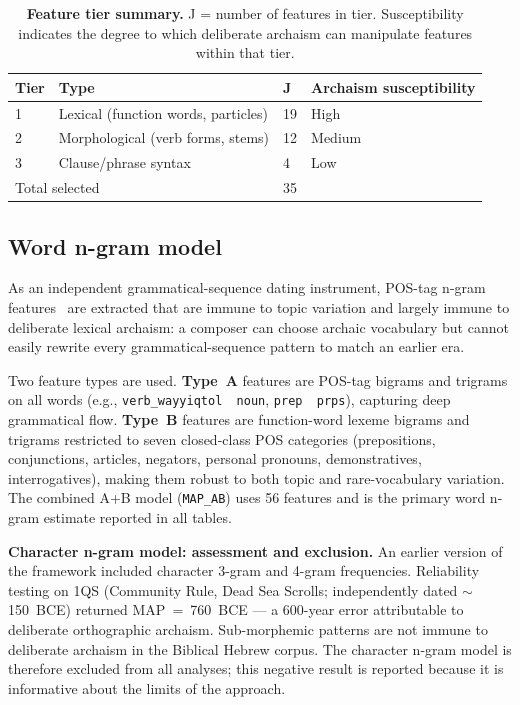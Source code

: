 \documentclass[10pt,letterpaper]{article}
\begin{document}
\begin{table}[!ht]
\centering
\caption{\textbf{Feature tier summary.}  J = number of features in tier.
Susceptibility indicates the degree to which deliberate archaism can
manipulate features within that tier.}
\begin{tabular}{llll}
\hline
\textbf{Tier} & \textbf{Type} & \textbf{J} & \textbf{Archaism susceptibility} \\
\hline
1 & Lexical (function words, particles) & 19 & High \\
2 & Morphological (verb forms, stems)   & 12 & Medium \\
3 & Clause/phrase syntax                &  4 & Low \\
\hline
\multicolumn{2}{l}{Total selected} & 35 & \\
\hline
\end{tabular}
\label{tab:features}
\end{table}

\subsection*{Word n-gram model}

As an independent grammatical-sequence dating instrument, POS-tag n-gram
features~\cite{Manning1999,Jurafsky2023} are extracted that are immune to
topic variation and largely immune to deliberate lexical archaism: a composer can choose archaic
vocabulary but cannot easily rewrite every grammatical-sequence pattern
to match an earlier era.

Two feature types are used.  \textbf{Type~A} features are POS-tag bigrams
and trigrams on all words (e.g., \texttt{verb\_wayyiqtol\,\textperiodcentered\,noun},
\texttt{prep\,\textperiodcentered\,prps}), capturing deep grammatical flow.
\textbf{Type~B} features are function-word lexeme bigrams and trigrams
restricted to seven closed-class POS categories (prepositions, conjunctions,
articles, negators, personal pronouns, demonstratives, interrogatives),
making them robust to both topic and rare-vocabulary variation.  The combined
A+B model (\texttt{MAP\_AB}) uses 56 features and is the primary word n-gram
estimate reported in all tables.

\textbf{Character n-gram model: assessment and exclusion.}  An earlier
version of the framework included character 3-gram and 4-gram frequencies.
Reliability testing on 1QS (Community Rule, Dead Sea Scrolls;
independently dated $\sim$150~BCE) returned MAP~=~760~BCE --- a 600-year
error attributable to deliberate orthographic archaism.  Sub-morphemic
patterns are not immune to deliberate archaism in the Biblical Hebrew
corpus.  The character n-gram model is therefore excluded from all
analyses; this negative result is reported because it is informative about
the limits of the approach.
\end{document}
